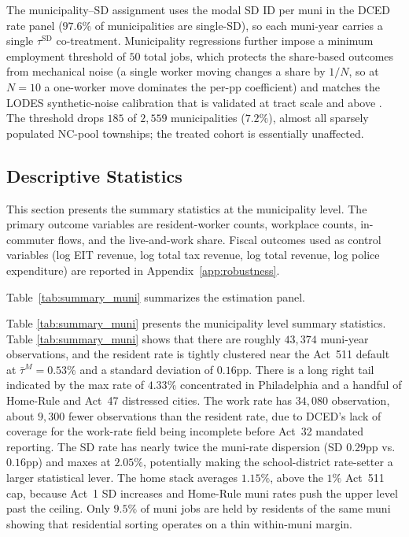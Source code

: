 \documentclass[12pt]{article}
\begin{document}
The municipality--SD assignment uses the modal SD ID per muni in
the DCED rate panel ($97.6\%$ of municipalities are single-SD), so
each muni-year carries a single $\tau^{\text{SD}}$ co-treatment.
Municipality regressions
further impose a
minimum employment threshold of $50$ total jobs, which protects the
share-based outcomes from mechanical noise (a single worker moving
changes a share by $1/N$, so at $N=10$ a one-worker move dominates
the per-pp coefficient) and matches the LODES synthetic-noise
calibration that is validated at tract scale and above
\citep{grahamDESIGNCOMPARISONLODES}. The threshold drops $185$ of
$2{,}559$ municipalities ($7.2\%$), almost all sparsely populated
NC-pool townships; the treated cohort is essentially unaffected.

\subsection{Descriptive Statistics}
\label{subsec:descriptive}

This section presents the summary statistics at the municipality
level. The primary outcome variables are resident-worker counts,
workplace counts, in-commuter flows, and the live-and-work share.
Fiscal outcomes used as control variables (log EIT revenue, log
total tax revenue, log total revenue, log police expenditure) are
reported in Appendix~\ref{app:robustness}.

Table~\ref{tab:summary_muni} summarizes the estimation panel.

% 



Table \ref{tab:summary_muni} presents the municipality level summary statistics. Table \ref{tab:summary_muni} shows that there are roughly $43{,}374$ muni-year observations, and the resident rate is tightly clustered
near the Act~511 default at $\bar{\tau}^{M}=0.53\%$ and a standard deviation of $0.16$pp. There is a long right tail indicated by the max rate of $4.33\%$ concentrated in Philadelphia and
a handful of Home-Rule and Act~47 distressed cities. The
work rate has $34{,}080$ observation, about $9{,}300$ fewer
observations than the resident rate, due to DCED's lack of coverage for the work-rate field being incomplete before Act~32 mandated
reporting. The SD rate has nearly twice the
muni-rate dispersion (SD $0.29$pp vs.\ $0.16$pp) and maxes at $2.05\%$, potentially making the school-district
rate-setter a larger statistical lever. The home stack averages
$1.15\%$, above the $1\%$ Act~511 cap, because Act~1 SD increases
and Home-Rule muni rates push the upper level past the ceiling.
Only $9.5\%$ of muni jobs are
held by residents of the same muni showing that residential sorting operates
on a thin within-muni margin.
\end{document}
